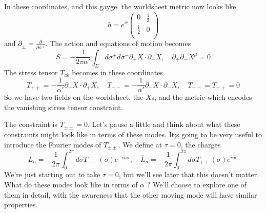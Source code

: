\documentclass[11pt, oneside]{article}   	%
\theoremstyle{slanted}
\begin{document}
In these coordinates, and this gayge, the 
worldsheet metric 
now looks like 
\[
	h  =e ^{ \phi } \begin{pmatrix}   0 & \frac{1}{2 } \\
	\frac{1}{2 } & 0 \\ \end{pmatrix} 
\] and $ \partial  _{ \pm }  = \frac{\partial  }{\partial  \sigma ^{ \pm } }   $. 
The action and equations of motion 
becomes 
\[
 S =  - \frac{1}{2 \pi \alpha ' } \int_{ \Sigma } d \sigma ^ + d \sigma ^  - 
 \partial  _ + X \cdot  \partial  _ - X , \quad \partial  _+ \partial  _ - X ^ \mu  =0 
\] The stress 
tensor $ T _{ ab } $ becomes in these coordinates 
\[
 T _{ ++ }   =  - \frac{1}{\alpha ' } \partial _ + X \cdot  \partial _ + X 
 , \quad T _{ -- }  = - \frac{1}{ \alpha ' } \partial _ - X \cdot  \partial  _ - X , 
 \quad T _{ + - }   = T _{ - +  } =0 
\] So we have two fields on the worldsheet, 
the $ X  $s, and the metric which encodes 
the vanishing stress tensor constraint. 

The constraint is  $ T _{ \pm \pm }  =0 $. 
Let's 
pause a little and think
about what these constraints 
might look like in 
terms of these modes. 
It;s going to be very useful to introduce 
the Fourier modes of $ T _{ \pm \pm } $. 
We define at $ \tau  = 0$, the charges 
\[
	L _ n  = - \frac{1}{2 \pi } \int_{ 0 } ^{ 2 \pi } d \sigma T _{ -- } \left( \sigma  \right)  e ^{  - i n \sigma } , \quad 
	\overline{ L } _ n  = -\frac{1}{2 \pi } \int _ 0 ^{ 2 \pi } d \sigma 
	T _{ ++ } \left( \sigma  \right)  e ^{ i n \sigma }
\] We're just starting out to take $ \tau  = 0 $, 
but we'll see later that this doesn't matter. 
What do these modes look like in terms of $ \alpha $ ? 
We'll choose to explore one of them in detail, 
with the awareness that the other moving mode 
will have similar properties. 
\end{document}
